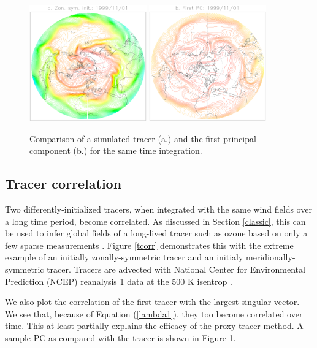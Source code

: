 \documentclass{article}
\begin{document}
\begin{figure}
\includegraphics[width=0.45\textwidth]{../pc_proxy/tsample.eps}
\includegraphics[width=0.45\textwidth]{../pc_proxy/pc1.eps}
\caption{Comparison of a simulated tracer (a.) and the first principal
component (b.) for the same time integration.}\label{pc1}
\end{figure}

\subsection{Tracer correlation}

Two differently-initialized tracers, when integrated with the same
wind fields over a long time period, become correlated.
As discussed in Section \ref{classic},
this can be used to infer global fields of a long-lived tracer such as
ozone based on only a few sparse measurements 
\citep{Allen_Nakamura2003,Randall_etal2002}.
Figure \ref{tcorr} demonstrates this with the extreme example of an initially
zonally-symmetric tracer and an initialy meridionally-symmetric tracer.
Tracers are advected with National Center for Environmental Prediction
(NCEP) reanalysis 1 data at the 500 K isentrop \citep{Kalnay_etal1996}.

We also plot the correlation of the first tracer with the largest singular
vector.  We see that, because of Equation (\ref{lambda1}), they too become
correlated over time.
This at least partially explains the efficacy of the proxy tracer method.
A sample PC as compared with the tracer is shown in Figure \ref{pc1}.  
\end{document}
